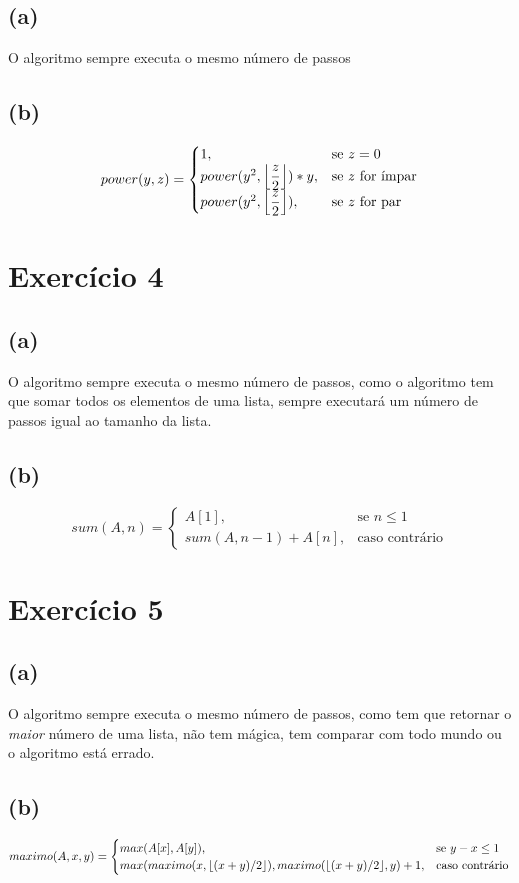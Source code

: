 \documentclass{article}
\DeclarePairedDelimiter\floor{\lfloor}{\rfloor}
\begin{document}
\subsection*{(a)}
O algoritmo sempre executa o mesmo número de passos
\subsection*{(b)}
\begin{equation}
    power(y,z)=\begin{cases}
    1, & \text{se }z = 0\\
    power(y^2, \floor*{\dfrac{z}{2}})*y, & \text{se $z$ for ímpar}\\
    power(y^2, \floor*{\dfrac{z}{2}}), & \text{se $z$ for par}
\end{cases}
\end{equation}

\section{Exercício 4}
\subsection*{(a)}
O algoritmo sempre executa o mesmo número de passos, como o algoritmo tem que somar
todos os elementos de uma lista, sempre executará um número de passos igual ao
tamanho da lista.
\subsection*{(b)}
\begin{equation}
    sum(A,n)=\begin{cases}
    A[1], & \text{se $n \leq 1$}\\
    sum(A, n-1)+ A[n], &\text{caso contrário}
\end{cases}
\end{equation}

\section{Exercício 5}
\subsection*{(a)}
O algoritmo sempre executa o mesmo número de passos, como tem que retornar o
\textit{maior} número de uma lista, não tem mágica, tem comparar com todo mundo
ou o algoritmo está errado.
\subsection*{(b)}
\begin{equation}
    maximo(A,x,y)=\begin{cases}
    max(A[x],A[y]), &\text{se $y-x\leq1$}\\
    max(maximo(x,\floor*{(x+y)/2}), maximo(\floor*{(x+y)/2},y)+1, & \text{caso contrário}
\end{cases}
\end{equation}
\end{document}
